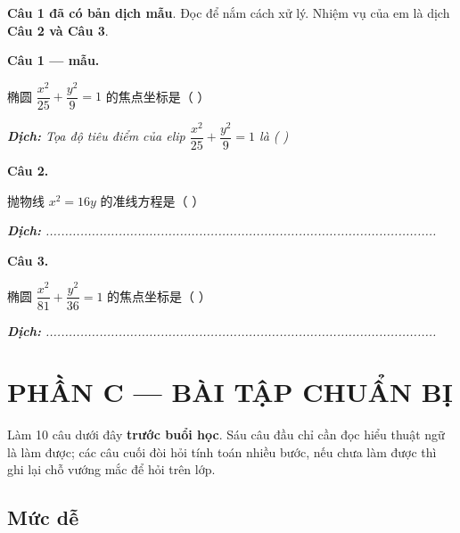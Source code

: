 \documentclass[11pt, a4paper]{article}
\begin{document}
\textbf{Câu 1 đã có bản dịch mẫu}. Đọc để nắm cách xử lý. Nhiệm vụ của em là dịch \textbf{Câu 2 và Câu 3}.

\textbf{Câu 1 — mẫu.}

椭圆 $\dfrac{x^2}{25} + \dfrac{y^2}{9} = 1$ 的焦点坐标是（ ）

\noindent\emph{\textbf{Dịch:} Tọa độ tiêu điểm của elip $\dfrac{x^2}{25} + \dfrac{y^2}{9} = 1$ là ( )}

\textbf{Câu 2.}

抛物线 $x^2 = 16y$ 的准线方程是（ ）

\noindent\emph{\textbf{Dịch:} ......................................................................................................}

\textbf{Câu 3.}

椭圆 $\dfrac{x^2}{81} + \dfrac{y^2}{36} = 1$ 的焦点坐标是（ ）

\noindent\emph{\textbf{Dịch:} ......................................................................................................}

\section{PHẦN C — BÀI TẬP CHUẨN BỊ}

Làm 10 câu dưới đây \textbf{trước buổi học}. Sáu câu đầu chỉ cần đọc hiểu thuật ngữ là làm được; các câu cuối đòi hỏi tính toán nhiều bước, nếu chưa làm được thì ghi lại chỗ vướng mắc để hỏi trên lớp.

\subsection{Mức dễ}
\end{document}
